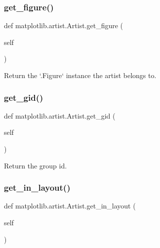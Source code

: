 \subsubsection{\texorpdfstring{get\+\_\+figure()}{get\_figure()}}
{\footnotesize\ttfamily def matplotlib.\+artist.\+Artist.\+get\+\_\+figure (\begin{DoxyParamCaption}\item[{}]{self }\end{DoxyParamCaption})}

\begin{DoxyVerb}Return the `.Figure` instance the artist belongs to.\end{DoxyVerb}
 \mbox{\label{classmatplotlib_1_1artist_1_1Artist_a445dd71c5287e4e70f31012216803ff8}} 
\subsubsection{\texorpdfstring{get\+\_\+gid()}{get\_gid()}}
{\footnotesize\ttfamily def matplotlib.\+artist.\+Artist.\+get\+\_\+gid (\begin{DoxyParamCaption}\item[{}]{self }\end{DoxyParamCaption})}

\begin{DoxyVerb}Return the group id.\end{DoxyVerb}
 \mbox{\label{classmatplotlib_1_1artist_1_1Artist_ab3183de1b13f4a17e3f8f8d669602560}} 
\subsubsection{\texorpdfstring{get\+\_\+in\+\_\+layout()}{get\_in\_layout()}}
{\footnotesize\ttfamily def matplotlib.\+artist.\+Artist.\+get\+\_\+in\+\_\+layout (\begin{DoxyParamCaption}\item[{}]{self }\end{DoxyParamCaption})}

